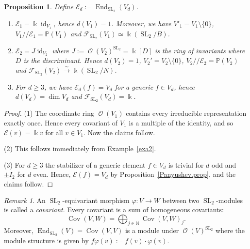 \documentclass{amsart}
\newtheorem{prop}[thm]{Proposition}
\theoremstyle{definition}
\theoremstyle{remark}
\newtheorem{rem}[thm]{Remark}
\begin{document}
\begin{prop} Define ${\mathcal E}_{d}:=\operatorname{End}_{\operatorname{SL}_{2}}(V_{d})$.
\begin{enumerate}
\item ${\mathcal E}_{1} = {\Bbbk}\operatorname{id}_{V_{1}}$, hence $d(V_{1}) = 1$. Moreover, we have $V'_{1}=V_{1}\setminus\{0\}$, $V_{1}{/\!\!/} {\mathcal E}_{1} = {\mathbb P}(V_{1})$ and ${\mathcal F}_{\operatorname{SL}_{2}}(V_{1})\simeq {\Bbbk}(\operatorname{SL}_{2}/B)$.
\item ${\mathcal E}_{2} = J\operatorname{id}_{V_{2}}$ where $J := \operatorname{\mathcal O}(V_{2})^{\operatorname{SL}_{2}}={\Bbbk}[D]$ is the ring of invariants where $D$ is the discriminant. Hence $d(V_{2}) = 1$,  $V_{2}' = V_{2}\setminus \{0\}$, $V_{2}{/\!\!/} {\mathcal E}_{2} = {\mathbb P}(V_{2})$ and ${\mathcal F}_{\operatorname{SL}_{2}}(V_{2}) {\xrightarrow{\sim}} {\Bbbk}({\operatorname{SL}_{2}}/N)$.
\item For $d\geq 3$, we have ${\mathcal E}_{d}(f) = V_{d}$ for a generic $f \in V_{d}$, hence $d(V_{d}) = \dim V_{d}$ and 
${\mathcal F}_{\operatorname{SL}_{2}}(V_{d})={\Bbbk}$.
\end{enumerate}
\end{prop}
\begin{proof}
(1) The coordinate ring $\operatorname{\mathcal O}(V_{1})$ contains every irreducible representation exactly once. Hence every covariant  of $V_{1}$ is a multiple of the identity, and so ${\mathcal E}(v) = {\Bbbk} v$ for all $v \in V_{1}$. Now the claims follow.
\par\smallskip
(2) This follows immediately from Example~\ref{exa2}.
\par\smallskip
(3) For $d\geq 3$ the stabilizer of a generic element $f\in V_{d}$ is trivial for $d$ odd and $\pm I_{2}$ for $d$ even. Hence, ${\mathcal E}(f) = V_{d}$ by Proposition~\ref{Panyushev.prop}, and the claims follow.
\end{proof}
\begin{rem}\label{covariant.rem}
An ${\operatorname{SL}_{2}}$-equivariant morphism ${\varphi}\colon V \to W$ between two ${\operatorname{SL}_{2}}$-modules is called a {\it covariant}. Every covariant is a sum of homogeneous covariants: 
$$
\operatorname{Cov}(V,W)=\bigoplus_{j\in{\mathbb N}}\operatorname{Cov}(V,W)_{j}.
$$ 
Moreover, $\operatorname{End}_{\operatorname{SL}_{2}}(V) = \operatorname{Cov}(V,V)$ is a module under $\operatorname{\mathcal O}(V)^{\operatorname{SL}_{2}}$ where the module structure is given by  $f{\varphi}(v) := f(v)\cdot{\varphi}(v)$.
\end{rem}
\end{document}
